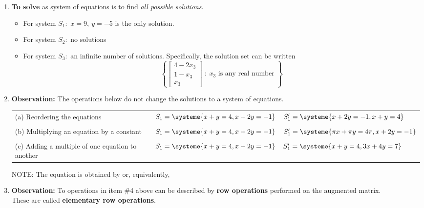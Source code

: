 \documentclass[11pt,fleqn]{article}
\def\vecthree#1#2#3{\begin{bmatrix}#1\\#2\\#3\end{bmatrix}}
\begin{document}
\begin{enumerate}
\item \textbf{To solve} as system of equations is to find \emph{all possible solutions}.
	\begin{itemize}
	\item For system $S_1:$ $x=9,\: y=-5$ is the only solution.\\
	\item For system  $S_2:$ no solutions\\
	\item For system $S_3:$ an infinite number of solutions. Specifically, the solution set can be written\\
	
	$$ \left\{ \vecthree{4-2x_3}{1-x_3}{x_3} \:  : \: x_3 \text{ is any real number } \right\}$$
	
	\end{itemize}
\newpage
\item \textbf{Observation:} The operations below do not change the solutions to a system of equations.\\

\begin{tabularx}{\textwidth}{XXX}
(a) Reordering the equations & $S_1=\systeme{x+y=4,x+2y=-1}$&$S'_1=\systeme{x+2y=-1,x+y=4}$\\
&&\\
(b) Multiplying an equation by a constant&$S_1=\systeme{x+y=4,x+2y=-1}$&$S'_1=\systeme{\pi x+\pi y=4\pi,x+2y=-1}$\\
 &&\\
 (c) Adding a multiple of one equation to another &$S_1=\systeme{x+y=4,x+2y=-1}$&$S'_1=\systeme{x+y=4,3x+4y=7}$\\

\end{tabularx}

\vspace{.2in}

NOTE: The equation  is obtained by  or, equivalently,  \\

\vspace{.2in}


\item \textbf{Observation:} To operations in item \#4 above can be described by \textbf{row operations} performed on the augmented matrix.\\

These are called \textbf{elementary row operations}.\\


\end{enumerate}
\end{document}
